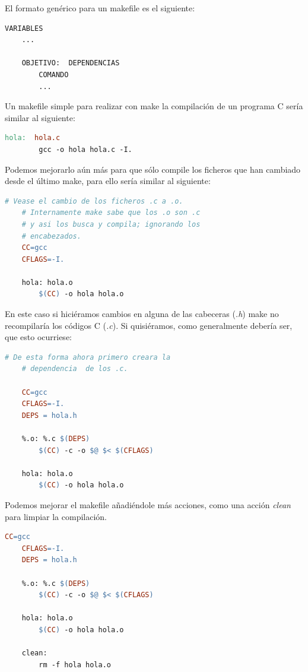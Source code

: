 \documentclass[a4paper, 11pt, titlepage]{article}
\begin{document}
    El formato genérico para un makefile es el siguiente:

    \begin{lstlisting}[language=make]
    VARIABLES
    ...
    
    OBJETIVO:  DEPENDENCIAS 
        COMANDO
        ...\end{lstlisting}

    Un makefile simple para realizar con make la compilación de un programa C sería similar al siguiente:

    \begin{lstlisting}[language=make]
    hola:  hola.c 
        gcc -o hola hola.c -I.\end{lstlisting}
    
    Podemos mejorarlo aún más para que sólo compile los ficheros que han cambiado desde el 
    último make, para ello sería similar al siguiente:

    \begin{lstlisting}[language=make]
    # Vease el cambio de los ficheros .c a .o.
    # Internamente make sabe que los .o son .c 
    # y asi los busca y compila; ignorando los 
    # encabezados.
    CC=gcc
    CFLAGS=-I.

    hola: hola.o
        $(CC) -o hola hola.o \end{lstlisting}
    
    En este caso si hiciéramos cambios en alguna de las cabeceras (\textit{.h}) make no 
    recompilaría los códigos C (\textit{.c}). Si quisiéramos, como generalmente debería ser,
    que esto ocurriese:

    \begin{lstlisting}[language=make]
    # De esta forma ahora primero creara la 
    # dependencia  de los .c.

    CC=gcc
    CFLAGS=-I.
    DEPS = hola.h
    
    %.o: %.c $(DEPS)
        $(CC) -c -o $@ $< $(CFLAGS)
    
    hola: hola.o 
        $(CC) -o hola hola.o\end{lstlisting}

    Podemos mejorar el makefile añadiéndole más acciones, como una acción \textit{clean} 
    para limpiar la compilación.
    
    \begin{lstlisting}[language=make]
    CC=gcc
    CFLAGS=-I.
    DEPS = hola.h
    
    %.o: %.c $(DEPS)
        $(CC) -c -o $@ $< $(CFLAGS)
    
    hola: hola.o 
        $(CC) -o hola hola.o
    
    clean: 
        rm -f hola hola.o\end{lstlisting}
\end{document}
